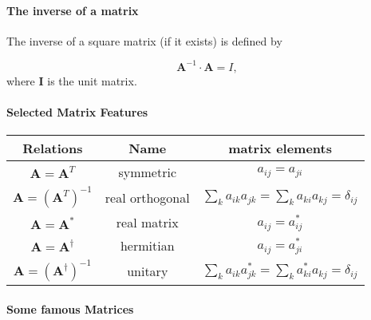 \paragraph{The inverse of a matrix}
\begin{block}{}
The inverse of a square matrix (if it exists) is defined by

\[
\bm{A}^{-1} \cdot \bm{A} = I,
\]
where $\bm{I}$ is the unit matrix.
\end{block}


\paragraph{Selected Matrix Features}


{\footnotesize
\begin{tabular}{ccc}
\hline
\multicolumn{1}{c}{ Relations } & \multicolumn{1}{c}{ Name } & \multicolumn{1}{c}{ matrix elements } \\
\hline
$\bm{A} = \bm{A}^{T}$                            & symmetric       & $a_{ij} = a_{ji}$                                                       \\
$\bm{A} = \left (\bm{A}^{T} \right )^{-1}$       & real orthogonal & $\sum_k a_{ik} a_{jk} = \sum_k a_{ki} a_{kj} = \delta_{ij}$             \\
$\bm{A} = \bm{A}^{ * }$                          & real matrix     & $a_{ij} = a_{ij}^{ * }$                                                 \\
$\bm{A} = \bm{A}^{\dagger}$                      & hermitian       & $a_{ij} = a_{ji}^{ * }$                                                 \\
$\bm{A} = \left (\bm{A}^{\dagger} \right )^{-1}$ & unitary         & $\sum_k a_{ik} a_{jk}^{ * } = \sum_k a_{ki}^{ * } a_{kj} = \delta_{ij}$ \\
\hline
\end{tabular}
}



\paragraph{Some famous Matrices}

